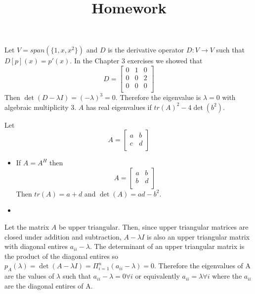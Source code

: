 \documentclass[12pt]{article}
\title{Homework}
\newenvironment{problem}[2][Problem]{\begin{trivlist}
\item[\hskip \labelsep {\bfseries #1}\hskip \labelsep {\bfseries #2}]}{\end{trivlist}}
\begin{document}
\begin{problem}{2.}
Let $V = span(\{1,x,x^2\})$ and $D$ is the derivative operator $D: V \to V$ such that $D[p](x) = p'(x)$. In the Chapter 3 exercises we showed that \[
   D=
  \left[ {\begin{array}{ccc}
   0 & 1 & 0\\
   0 & 0 & 2\\
   0 & 0 & 0\\
  \end{array} } \right]
\]
Then $\det(D - \lambda I) = (-\lambda)^3 = 0$. Therefore the eigenvalue is $\lambda = 0$ with algebraic multiplicity 3. $A$ has real eigenvalues if $tr(A)^2 - 4\det(b^2)$. 
 \end{problem}

\begin{problem}{4.} 
Let   \[ A=
  \left[ {\begin{array}{ccc}
   a & b\\
   c & d\\
  \end{array} } \right]
\]

\begin{itemize}
\item [(i)] If $A = A^H$ then 
\[ A=
  \left[ {\begin{array}{ccc}
   a & b\\
   b & d\\
  \end{array} } \right]
\]
Then $tr(A) = a + d$ and $\det(A) = ad-b^2$. 
\item [(ii)]
\end{itemize}
\end{problem}

\begin{problem}{6.} Let the matrix $A$ be upper triangular. Then, since upper triangular matrices are closed under addition and subtraction, $A-\lambda I$ is also an upper triangular matrix with diagonal entires $a_{ii} - \lambda$. The determinant of an upper triangular matrix is the product of the diagonal entires so $p_A(\lambda) = \det( A-\lambda I) = \Pi_{i=1}^n  (a_{ii} - \lambda) = 0$. Therefore the eigenvalues of A are the values of $\lambda$ such that $a_{ii} - \lambda = 0 \forall i$ or equivalently  $a_{ii} = \lambda  \forall i$ where the $a_{ii}$ are the diagonal entires of A. 
\end{problem}
\end{document}
